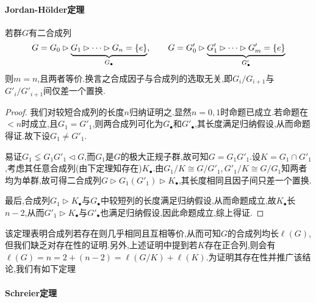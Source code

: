 \documentclass[11pt]{article} %
\begin{document}
\paragraph{Jordan-H\"older定理}
若群$G$有二合成列
$$G=G_0\rhd \underbrace{G_1\rhd\cdots\rhd G_n=\left\{e\right\}}_{G_\bullet},\qquad G=G'_0\rhd \underbrace{G'_1\rhd\cdots\rhd G'_m=\left\{e\right\}}_{G'_\bullet}$$
则$m=n$,且两者等价.换言之合成因子与合成列的选取无关,即$G_i/G_{i+1}$与$G'_i/G'_{i+1}$间仅差一个置换.
\begin{proof}
    我们对较短合成列的长度$n$归纳证明之.显然$n=0,1$时命题已成立.若命题在$<n$时成立,且$G_1=G'_1$,则两合成列可化为$G_\bullet$和$G'_\bullet$,其长度满足归纳假设,从而命题得证.故下设$G_1\neq G'_1$.
    
    易证$G_1\lneq G_1G'_1\lhd G$,而$G_1$是$G$的极大正规子群,故可知$G=G_1G'_1$.设$K=G_1\cap G'_1$,考虑其任意合成列(由下定理知存在)$K_\bullet$.由$G_1/K\cong G/G'_1, G'_1/K\cong G/G_1$知两者均为单群,故可得二合成列$G\rhd G_1(G'_1)\rhd K_\bullet$,其长度相同且因子间只差一个置换.
    
    最后,合成列$G_1\rhd K_\bullet$与$G_\bullet$中较短列的长度满足归纳假设,从而命题成立,故$K_\bullet$长$n-2$,从而$G'_1\rhd K_\bullet$与$G'_\bullet$也满足归纳假设,因此命题成立,综上得证.
\end{proof}
该定理表明合成列若存在则几乎相同且互相等价,从而可知$G$的合成列均长$\ell(G)$,但我们缺乏对存在性的证明.另外,上述证明中提到若$K$存在正合列,则会有$\ell(G)=n=2+(n-2)=\ell(G/K)+\ell(K)$.为证明其存在性并推广该结论,我们有如下定理

\paragraph{Schreier定理}%
\end{document}
